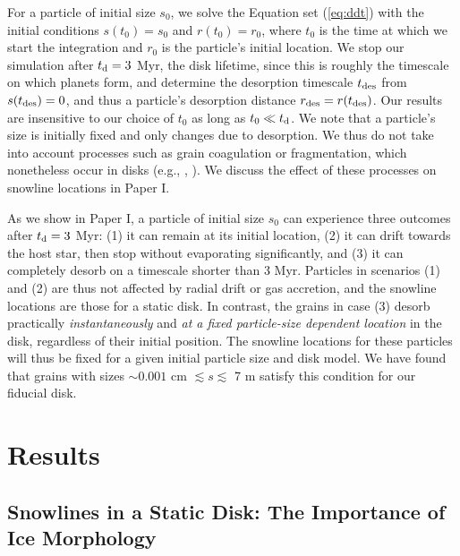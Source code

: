 \documentclass[apj]{emulateapj}
\newcommand{\emgr}[1]{\emph{ \color{gray} #1}}
\begin{document}
For a particle of initial size $s_0$, we solve the Equation set (\ref{eq:ddt}) with the initial conditions $s(t_0)=s_0$ and $r(t_0)=r_0$, where $t_0$ is the time at which we start the integration and $r_0$ is the particle's initial location. We stop our simulation after $t_{\rm d}=3$ Myr, the disk lifetime, since this is roughly the timescale on which planets form, and determine the desorption timescale $t_{\rm des}$ from $s(t_{\rm des})=0$, and thus a particle's desorption distance $r_{\rm des}=r(t_{\rm des})$. Our results are insensitive to our choice of $t_0$ as long as $t_0 \ll t_{\rm d}$. We note that a particle's size is initially fixed and only changes due to desorption. We thus do not take into account processes such as grain coagulation or fragmentation, which nonetheless occur in disks (e.g., \citealt{birnstiel12}, \citealt{perez12}). We discuss the effect of these processes on snowline locations in Paper I.

As we show in Paper I, a particle of initial size $s_0$ can experience three outcomes after $t_{\rm d}=3$ Myr: (1) it can remain at its initial location, (2) it can drift towards the host star, then stop without evaporating significantly, and (3) it can completely desorb on a timescale shorter than 3 Myr. Particles in scenarios (1) and (2) are thus not affected by radial drift or gas accretion, and the snowline locations are those for a static disk. In contrast, the grains in case (3) desorb practically \textit{instantaneously} and \textit{at a fixed particle-size dependent location} in the disk, regardless of their initial position. The snowline locations for these particles will thus be fixed for a given initial particle size and disk model. We have found that grains with sizes $\sim0.001$ cm $\lesssim s \lesssim$ 7 m satisfy this condition for our fiducial disk. 


\section{Results}
\label{sec:results}

\subsection{Snowlines in a Static Disk: The Importance of Ice Morphology}
\label{sec:snowlines}
\end{document}
